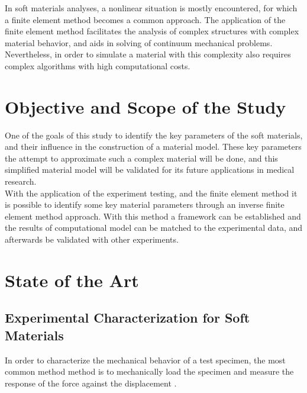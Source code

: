 In soft materials analyses, a nonlinear situation is mostly encountered, for which a finite 
element method becomes a common approach. The application of the finite element method
 facilitates the analysis of complex structures with complex material behavior, and aids in 
 solving of continuum mechanical problems. Nevertheless, in order to simulate a material with 
 this complexity also requires complex algorithms with high computational costs. \\

 \section{Objective and Scope of the Study} 
One of the goals of this study to identify the key parameters of the soft materials, and their 
influence in the construction of a material model. These key parameters the attempt to 
 approximate such a complex material will be done, and this simplified material model will be 
 validated for its future applications in medical research.\\
 
 With the application of the experiment testing, and the finite element method it is possible 
 to identify some key material parameters through an inverse finite element method approach. With this 
 method a framework can be established and the results of computational model can be matched 
 to the experimental data, and afterwards be validated with other experiments.


\section{State of the Art}

\subsection{Experimental Characterization for Soft Materials}
In order to characterize the mechanical behavior of a test specimen, the most common method
method is to mechanically load the specimen and measure the response of the force against 
the displacement \cite{Bergström2015}. 



